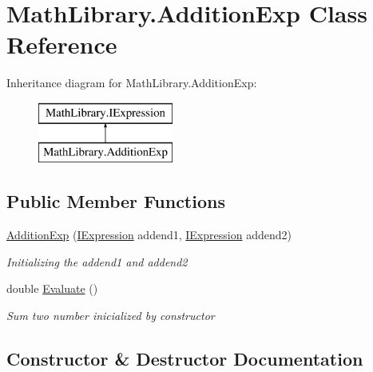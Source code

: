 \hypertarget{class_math_library_1_1_addition_exp}{}\section{Math\+Library.\+Addition\+Exp Class Reference}
\label{class_math_library_1_1_addition_exp}
Inheritance diagram for Math\+Library.\+Addition\+Exp\+:\begin{figure}[H]
\begin{center}
\leavevmode
\includegraphics[height=2.000000cm]{class_math_library_1_1_addition_exp}
\end{center}
\end{figure}
\subsection*{Public Member Functions}
\begin{DoxyCompactItemize}
\item 
\mbox{\hyperlink{class_math_library_1_1_addition_exp_aed568a3276c7edfb108e577e6a1870fe}{Addition\+Exp}} (\mbox{\hyperlink{interface_math_library_1_1_i_expression}{I\+Expression}} addend1, \mbox{\hyperlink{interface_math_library_1_1_i_expression}{I\+Expression}} addend2)
\begin{DoxyCompactList}\small\item\em Initializing the addend1 and addend2 \end{DoxyCompactList}\item 
double \mbox{\hyperlink{class_math_library_1_1_addition_exp_ad3603c036ab0ce56f55f6a76c9566246}{Evaluate}} ()
\begin{DoxyCompactList}\small\item\em Sum two number inicialized by constructor \end{DoxyCompactList}\end{DoxyCompactItemize}


\subsection{Constructor \& Destructor Documentation}
\mbox{\label{class_math_library_1_1_addition_exp_aed568a3276c7edfb108e577e6a1870fe}} 
